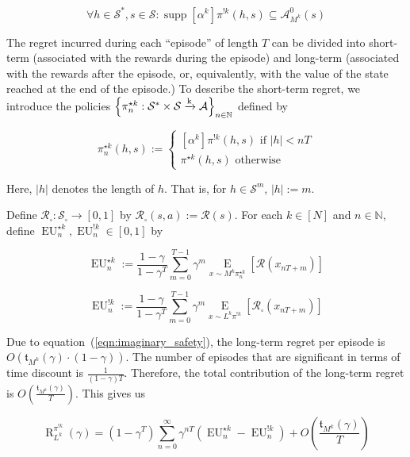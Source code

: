 \documentclass[anon,12pt]{colt2018} %
\DeclareMathOperator{\Supp}{supp}
\newcommand{\AP}[1]{\left(#1\right)}
\newcommand{\AB}[1]{\left[#1\right]}
\newcommand{\AC}[1]{\left\{#1\right\}}
\newcommand{\Ea}[2]{\underset{#1}{\operatorname{E}}\AB{#2}}
\newcommand{\Nats}{\mathbb{N}}
\newcommand{\Abs}[1]{\left\vert #1 \right\vert}
\newcommand{\K}{\xrightarrow{\textnormal{k}}}
\newcommand{\A}{\mathcal{A}}
\newcommand{\St}{\mathcal{S}}
\newcommand{\R}{\mathcal{R}}
\newcommand{\EU}{\operatorname{EU}}
\newcommand{\Rg}{\operatorname{R}}
\newcommand{\MP}[2]{#1#2}
\newcommand{\AdP}[2]{\AB{#1}#2}
\newcommand{\Tn}{\mathfrak{t}}
\newcommand{\Ad}{\alpha}
\newcommand{\IP}{\pi^{!k}}
\begin{document}
\begin{equation}
\label{eqn:imaginary_safety}
\forall h\in\St^*,s\in\St: \Supp{\AdP{\Ad^k}{\IP}(h,s)} \subseteq \A_{M^k}^0(s)
\end{equation}

The regret incurred during each \enquote{episode} of length $T$ can be divided into short-term (associated with the rewards during the episode) and long-term (associated with the rewards after the episode, or, equivalently, with the value of the state reached at the end of the episode.) To describe the short-term regret, we introduce the policies $\AC{\pi_n^{\star k}: \St^* \times \St \K \A}_{n \in \Nats}$ defined by

\begin{equation}
\pi_n^{\star k}(h,s):=\begin{cases} \AdP{\Ad^k}{\IP}(h,s) \text{ if } \Abs{h} < nT \\ \pi^{\star k}(h,s) \text{ otherwise} \end{cases}
\end{equation}

Here, $\Abs{h}$ denotes the length of $h$. That is, for $h \in \St^m$, $\Abs{h}:=m$.

Define $\R_\square: \St_\square \rightarrow [0,1]$ by $\R_\square(s,a):=\R(s)$. For each $k\in[N]$ and $n\in\Nats$, define $\EU_n^{\star k},\EU_n^{!k}\in[0,1]$ by

\begin{equation}
\EU_n^{\star k}:=\frac{1-\gamma}{1-\gamma^T}\sum_{m=0}^{T-1} \gamma^m \Ea{x\sim{\MP{M^k}{\pi_n^{\star  k}}}}{\R\AP{x_{nT+m}}}
\end{equation}

\begin{equation}
\EU_n^{!k}:=\frac{1-\gamma}{1-\gamma^T}\sum_{m=0}^{T-1} \gamma^m \Ea{x\sim{\MP{L^k}{\IP}}}{\R_\square\AP{x_{nT+m}}}
\end{equation}

Due to equation~(\ref{eqn:imaginary_safety}), the long-term regret per episode is $O\AP{\Tn_{M^k}(\gamma)\cdot(1-\gamma)}$. The number of episodes that are significant in terms of time discount is $\frac{1}{(1-\gamma)T}$. Therefore, the total contribution of the long-term regret is $O\AP{\frac{\Tn_{M^k}(\gamma)}{T}}$. This gives us

\begin{equation}
\label{eqn:short_long_decomposition}
\Rg_{L^k}^{\IP}(\gamma) = \AP{1-\gamma^T}\sum_{n=0}^\infty \gamma^{nT}\AP{\EU^{\star k}_n-\EU^{!k}_n}+O\AP{\frac{\Tn_{M^k}(\gamma)}{T}}
\end{equation}
\end{document}
